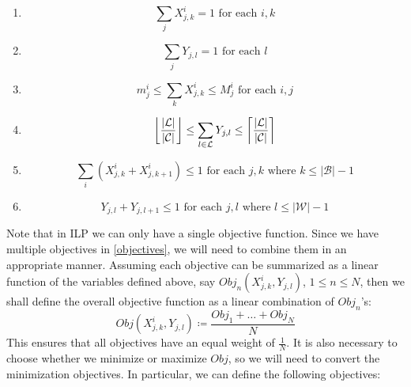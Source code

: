 \documentclass[]{article}
\newcommand{\mc}{\mathcal}
\DeclarePairedDelimiter{\floor}{\lfloor}{\rfloor}
\DeclarePairedDelimiter{\ceil}{\lceil}{\rceil}
\begin{document}
	\begin{enumerate}
		\item 
			\begin{equation}
				\sum_j X^i_{j, k} = 1 \text{ for each } i, k
			\end{equation}
		\item
			\begin{equation}
				\sum_j Y_{j, l} = 1 \text{ for each } l
			\end{equation}
		\item 
			\begin{equation}
				m^i_j \leq \sum_{k} X^i_{j, k} \leq M^i_j \text{ for each } i, j
			\end{equation}
		\item
			\begin{equation}
				\floor*{\frac{|\mc{L}|}{|\mc{C}|}} \leq \sum_{l \in \mc{L}} Y_{j, l} \leq \ceil*{\frac{|\mc{L}|}{|\mc{C}|}}
			\end{equation}
		\item
			\begin{equation}
				\sum_i \left(X^i_{j, k} + X^i_{j, k+1}\right) \leq 1 \text{ for each } j,k \text{ where } k \leq |\mc{B}| - 1
			\end{equation}
		\item
			\begin{equation}
				Y_{j, l} + Y_{j, l+1} \leq 1 \text{ for each } j, l \text{ where } l \leq |\mc{W}| - 1
			\end{equation}
	\end{enumerate}
Note that in ILP we can only have a single objective function. Since we have multiple objectives in \ref{objectives}, we will need to combine them in an appropriate manner. Assuming each objective can be summarized as a linear function of the variables defined above, say $Obj_n\left(X^i_{j, k}, Y_{j, l}\right)$, $1 \leq n \leq N$, then we shall define the overall objective function as a linear combination of $Obj_n$'s:
	\begin{equation}
		Obj\left(X^i_{j, k}, Y_{j, l}\right) \coloneqq \frac{Obj_1 + \ldots + Obj_N}{N} 
	\end{equation}
This ensures that all objectives have an equal weight of $\frac{1}{N}$. It is also necessary to choose whether we minimize or maximize $Obj$, so we will need to convert the minimization objectives. In particular, we can define the following objectives:
\end{document}
